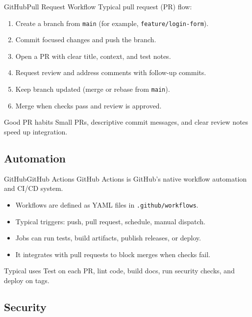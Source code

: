 \documentclass[10pt,compress]{beamer}
\begin{document}
\begin{frame}{GitHub}{Pull Request Workflow}
Typical pull request (PR) flow:
\begin{enumerate}
 \item Create a branch from \texttt{main} (for example, \texttt{feature/login-form}).
 \item Commit focused changes and push the branch.
 \item Open a PR with clear title, context, and test notes.
 \item Request review and address comments with follow-up commits.
 \item Keep branch updated (merge or rebase from \texttt{main}).
 \item Merge when checks pass and review is approved.
\end{enumerate}

\begin{block}{Good PR habits}
Small PRs, descriptive commit messages, and clear review notes speed up integration.
\end{block}
\end{frame}

\subsection{Automation}

\begin{frame}{GitHub}{GitHub Actions}
GitHub Actions is GitHub's native workflow automation and CI/CD system.

\begin{itemize}
 \item Workflows are defined as YAML files in \texttt{.github/workflows}.
 \item Typical triggers: push, pull request, schedule, manual dispatch.
 \item Jobs can run tests, build artifacts, publish releases, or deploy.
 \item It integrates with pull requests to block merges when checks fail.
\end{itemize}

\begin{block}{Typical uses}
Test on each PR, lint code, build docs, run security checks, and deploy on tags.
\end{block}
\end{frame}

\subsection{Security}
\end{document}
